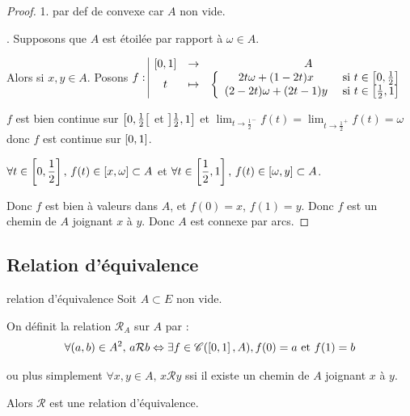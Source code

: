 \begin{proof}
    1. par def de convexe car $A$ non vide. 

    . Supposons que $A$ est étoilée par rapport à $\omega \in A$.

    Alors si $x, y \in A$. Posons $f: \space \begin{array}{|ccc}
    \left[0, 1\right] & \to & A \\
    t & \mapsto & \left\{ \begin{array}{cc}
        2t \omega + (1 - 2t)x & \text{ si } t \in \left[0, \frac 1 2\right] \\
        (2 - 2t) \omega + (2t - 1)y & \text{ si } t \in \left[\frac 1 2, 1\right]        
    \end{array} \right.
  \end{array}$

    $f$ est bien continue sur $\left[0, \frac 1 2\right[$ et $\left]\frac 1 2, 1\right]$ et 
    $\displaystyle \lim_{t \to \frac 1 2^-} f(t) = \lim_{t \to \frac 1 2^+} f(t) = \omega$ donc $f$ est continue sur $\left[0, 1\right]$.

    $\displaystyle \forall t \in \left[0, \frac 1 2\right], \, f(t) \in \left[x, \omega\right] \subset A$ et
    $\displaystyle \forall t \in \left[\frac 1 2, 1\right], \, f(t) \in \left[\omega, y\right] \subset A$.

    Donc $f$ est bien à valeurs dans $A$, et $f(0) = x$, $f(1) = y$. 
    Donc $f$ est un chemin de $A$ joignant $x$ à $y$. Donc $A$ est connexe par arcs.
\end{proof}

\subsection{Relation d'équivalence }

\begin{theoreme}{relation d'équivalence}{}
    Soit $A \subset E$ non vide.

    On définit la relation $\mathcal R_A$ sur $A$ par : 
    $$\forall (a, b) \in A^2, \, a \mathcal R b \Leftrightarrow \exists f \in \mathscr C(\left[0, 1\right], A), f(0) = a \text{ et } f(1) = b$$

    ou plus simplement $\forall x, y \in A, \, x \mathcal R y$ ssi il existe un chemin de $A$ joignant $x$ à $y$.
    
    Alors $\mathcal R$ est une relation d'équivalence.
\end{theoreme}

